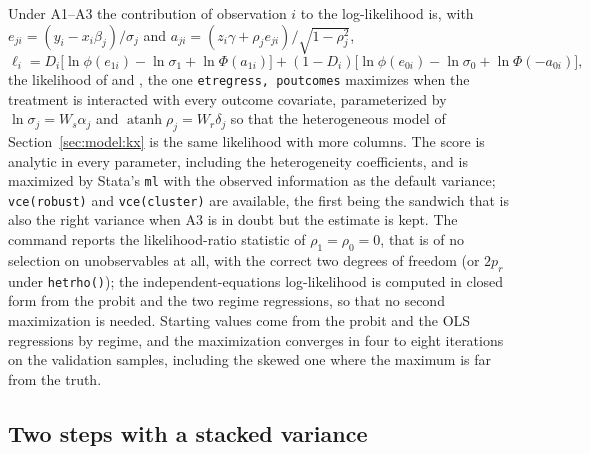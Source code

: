 \documentclass[11pt,a4paper]{article}
\theoremstyle{plain}
\theoremstyle{definition}
\theoremstyle{remark}
\newcommand{\1}{\mathbf{1}}
\newcommand{\cmd}[1]{\texttt{#1}}
\begin{document}
Under A1--A3 the contribution of observation $i$ to the log-likelihood
is, with $e_{ji}=(y_i-x_i\beta_j)/\sigma_j$ and
$a_{ji}=(z_i\gamma+\rho_je_{ji})/\sqrt{1-\rho_j^2}$,
\begin{equation}\label{eq:ll}
\ell_i=D_i\bigl[\ln\phi(e_{1i})-\ln\sigma_1+\ln\Phi(a_{1i})\bigr]
      +(1-D_i)\bigl[\ln\phi(e_{0i})-\ln\sigma_0+\ln\Phi(-a_{0i})\bigr],
\end{equation}
the likelihood of \citet[p.~224]{maddala1983} and \citet{lokshin2004},
the one \cmd{etregress, poutcomes} maximizes when the treatment is
interacted with every outcome covariate, parameterized by
$\ln\sigma_j=W_s\alpha_j$ and $\operatorname{atanh}\rho_j=W_r\delta_j$
so that the heterogeneous model of Section~\ref{sec:model:kx} is the
same likelihood with more columns. The score is analytic in every
parameter, including the heterogeneity coefficients, and is maximized
by Stata's \cmd{ml} with the observed information as the default
variance; \cmd{vce(robust)} and \cmd{vce(cluster)} are available, the
first being the sandwich that is also the right variance when A3 is
in doubt but the estimate is kept. The command reports the
likelihood-ratio statistic of $\rho_1=\rho_0=0$, that is of no selection
on unobservables at all, with the correct two degrees of freedom (or
$2p_r$ under \cmd{hetrho()}); the independent-equations log-likelihood is
computed in closed form from the probit and the two regime regressions,
so that no second maximization is needed. Starting values come from the
probit and the OLS regressions by regime, and the maximization converges
in four to eight iterations on the validation samples, including the
skewed one where the maximum is far from the truth.

\subsection{Two steps with a stacked variance}\label{sec:est:twostep}
\end{document}
